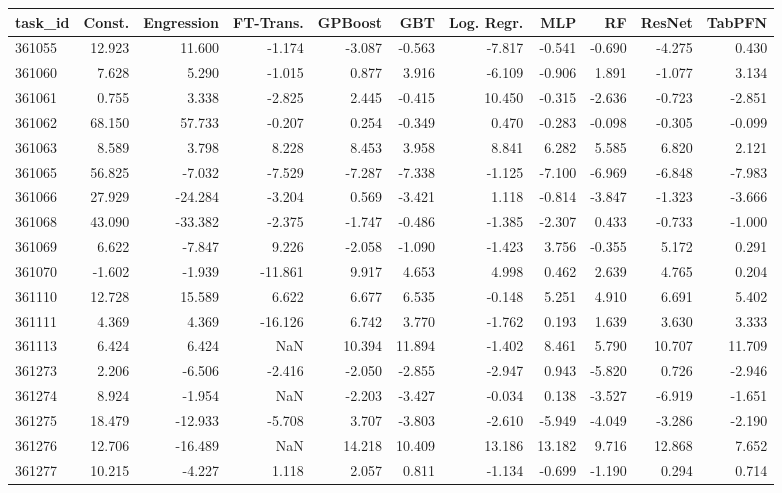 \begin{tabular}{lrrrrrrrrrr}
\toprule
task\_id & Const. & Engression & FT-Trans. & GPBoost & GBT & Log. Regr. & MLP & RF & ResNet & TabPFN \\
\midrule
361055 & 12.923 & 11.600 & -1.174 & -3.087 & -0.563 & -7.817 & -0.541 & -0.690 & -4.275 & 0.430 \\
361060 & 7.628 & 5.290 & -1.015 & 0.877 & 3.916 & -6.109 & -0.906 & 1.891 & -1.077 & 3.134 \\
361061 & 0.755 & 3.338 & -2.825 & 2.445 & -0.415 & 10.450 & -0.315 & -2.636 & -0.723 & -2.851 \\
361062 & 68.150 & 57.733 & -0.207 & 0.254 & -0.349 & 0.470 & -0.283 & -0.098 & -0.305 & -0.099 \\
361063 & 8.589 & 3.798 & 8.228 & 8.453 & 3.958 & 8.841 & 6.282 & 5.585 & 6.820 & 2.121 \\
361065 & 56.825 & -7.032 & -7.529 & -7.287 & -7.338 & -1.125 & -7.100 & -6.969 & -6.848 & -7.983 \\
361066 & 27.929 & -24.284 & -3.204 & 0.569 & -3.421 & 1.118 & -0.814 & -3.847 & -1.323 & -3.666 \\
361068 & 43.090 & -33.382 & -2.375 & -1.747 & -0.486 & -1.385 & -2.307 & 0.433 & -0.733 & -1.000 \\
361069 & 6.622 & -7.847 & 9.226 & -2.058 & -1.090 & -1.423 & 3.756 & -0.355 & 5.172 & 0.291 \\
361070 & -1.602 & -1.939 & -11.861 & 9.917 & 4.653 & 4.998 & 0.462 & 2.639 & 4.765 & 0.204 \\
361110 & 12.728 & 15.589 & 6.622 & 6.677 & 6.535 & -0.148 & 5.251 & 4.910 & 6.691 & 5.402 \\
361111 & 4.369 & 4.369 & -16.126 & 6.742 & 3.770 & -1.762 & 0.193 & 1.639 & 3.630 & 3.333 \\
361113 & 6.424 & 6.424 & NaN & 10.394 & 11.894 & -1.402 & 8.461 & 5.790 & 10.707 & 11.709 \\
361273 & 2.206 & -6.506 & -2.416 & -2.050 & -2.855 & -2.947 & 0.943 & -5.820 & 0.726 & -2.946 \\
361274 & 8.924 & -1.954 & NaN & -2.203 & -3.427 & -0.034 & 0.138 & -3.527 & -6.919 & -1.651 \\
361275 & 18.479 & -12.933 & -5.708 & 3.707 & -3.803 & -2.610 & -5.949 & -4.049 & -3.286 & -2.190 \\
361276 & 12.706 & -16.489 & NaN & 14.218 & 10.409 & 13.186 & 13.182 & 9.716 & 12.868 & 7.652 \\
361277 & 10.215 & -4.227 & 1.118 & 2.057 & 0.811 & -1.134 & -0.699 & -1.190 & 0.294 & 0.714 \\

\end{tabular}
